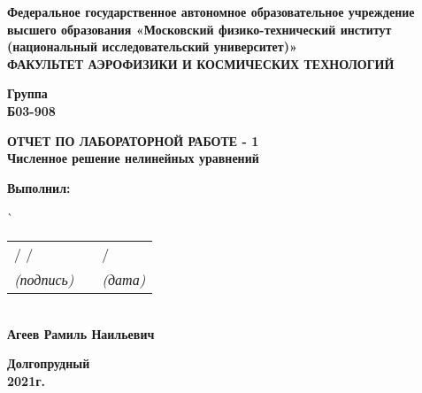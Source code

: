 \documentclass[a4paper,12pt]{article}
\begin{document}
\begin{titlepage}

\begin{center}
     \textbf{Федеральное государственное автономное образовательное учреждение высшего образования «Московский физико-технический институт (национальный исследовательский университет)»\\
\vspace{0.5cm}
ФАКУЛЬТЕТ АЭРОФИЗИКИ И КОСМИЧЕСКИХ ТЕХНОЛОГИЙ}
\end{center}

\vspace{2 cm}

\begin {flushleft}
{\bf Группа}\\
{\bf Б03-908 } \\
\end{flushleft}

\vspace{2cm}
{\large
\begin{center}
    {\bf ОТЧЕТ ПО ЛАБОРАТОРНОЙ РАБОТЕ - 1\\
    \vspace{0.3cm}
   Численное решение нелинейных уравнений}
\end{center}
}

\vspace{3cm}


\begin{tabbing}

{\bf Выполнил:}

\`{\begin{tabular}{lll}
    / \hspace{2cm} /   && \hspace{2cm} / \\\cline{1-3} \cline{1-1}
           \textit{(подпись)}     && \textit{(дата)}
  \end{tabular}
}\\
{\bf Агеев Рамиль Наильевич}

\end{tabbing}


\vspace{0.5cm}

\vspace{6.5cm}
\begin{center}
    {\bf Долгопрудный \\
     2021г.}
\end{center}
\end{titlepage}
\end{document}
